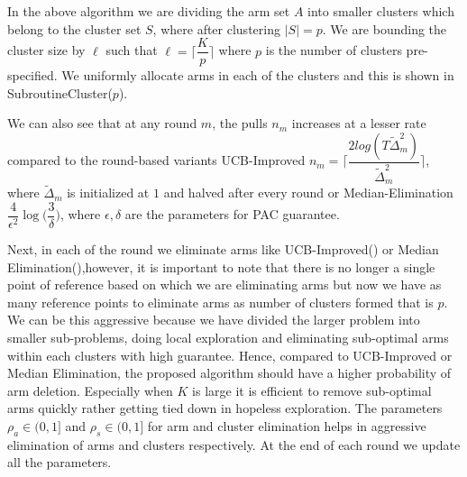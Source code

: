 In the above algorithm we are dividing the arm set $A$ into smaller clusters which belong to the cluster set $S$, where after clustering $|S|=p$. We are bounding the cluster size by $\ell$ such that $\ell=\bigg\lceil \dfrac{K}{p} \bigg\rceil$ where $p$ is the number of clusters pre-specified. We uniformly allocate arms in each of the clusters and this is shown in SubroutineCluster($p$).

We can also see that at any round $m$, the pulls $n_{m}$ increases at a lesser rate compared to the round-based variants UCB-Improved $n_{m}=\bigg\lceil \dfrac{2log(T\tilde{\Delta}_{m}^{2})}{\tilde{\Delta}_{m}^{2}} \bigg\rceil$, where $\tilde{\Delta}_{m}$ is initialized at $1$ and halved after every round or Median-Elimination $\dfrac{4}{\epsilon^{2}}\log\big(\dfrac{3}{\delta}\big)$, where $\epsilon,\delta$ are the parameters for PAC guarantee.

	Next, in each of the round we eliminate arms like UCB-Improved(\cite{auer2010ucb}) or Median Elimination(\cite{even2006action}),however, it is important to note that there is no longer a single point of reference based on which we are eliminating arms but now we have as many reference points to eliminate arms as number of clusters formed that is $p$. We can be this aggressive because we have divided the larger problem into smaller sub-problems, doing local exploration and eliminating sub-optimal arms within each clusters with high guarantee. Hence, compared to UCB-Improved or Median Elimination, the proposed algorithm should have a higher probability of arm deletion. Especially when $K$ is large it is efficient to remove sub-optimal arms quickly rather getting tied down in hopeless exploration. The parameters $\rho_{a}\in (0,1]$ and $\rho_{s}\in (0,1]$ for arm and cluster elimination helps in aggressive elimination of arms and clusters respectively. At the end of each round we update all the  parameters.

